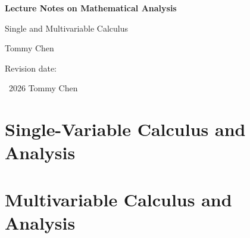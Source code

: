 \documentclass[11pt,oneside]{book}
\begin{document}
\frontmatter
{}
\begin{titlepage}
\centering
\vspace*{0.18\textheight}
{\Huge\bfseries Lecture Notes on Mathematical Analysis\par}
\vspace{0.8em}
{\Large Single and Multivariable Calculus\par}
\vspace{2.5em}
{\Large Tommy Chen\par}
\vfill
{\large \notesversion\par}
\vspace{0.4em}
{\large Revision date: \notesdate\par}
\vspace{1.5em}
{\normalsize \textcopyright\ 2026 Tommy Chen\par}
\vspace{0.35em}
{\normalsize \noteslicense\par}
\end{titlepage}
\begingroup
\fontsize{10}{10}\selectfont
\tableofcontents
\endgroup


\mainmatter
\part{Single-Variable Calculus and Analysis}









\part{Multivariable Calculus and Analysis}




\appendix









\backmatter

\end{document}
